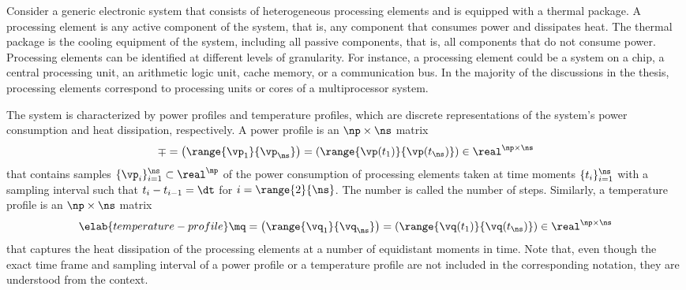 Consider a generic electronic system that consists of \np heterogeneous
processing elements and is equipped with a thermal package. A processing element
is any active component of the system, that is, any component that consumes
power and dissipates heat. The thermal package is the cooling equipment of the
system, including all passive components, that is, all components that do not
consume power. Processing elements can be identified at different levels of
granularity. For instance, a processing element could be a system on a chip,
a central processing unit, an arithmetic logic unit, cache memory, or a
communication bus. In the majority of the discussions in the thesis, processing
elements correspond to processing units or cores of a multiprocessor system.

The system is characterized by power profiles and temperature profiles, which
are discrete representations of the system's power consumption and heat
dissipation, respectively. A power profile is an $\np \times \ns$ matrix
\[
  \mp
  = \left(\range{\vp_1}{\vp_\ns}\right)
  = \left(\range{\vp(t_1)}{\vp(t_\ns)}\right) \in \real^{\np \times \ns}
\]
that contains \ns samples $\{ \vp_i \}_{i = 1}^\ns \subset \real^\np$ of the
power consumption of \np processing elements taken at \ns time moments $\{ t_i
\}_{i = 1}^\ns$ with a sampling interval \dt such that $t_i - t_{i - 1} = \dt$
for $i = \range{2}{\ns}$. The number \ns is called the number of steps.
Similarly, a temperature profile is an $\np \times \ns$ matrix
\begin{equation} \elab{temperature-profile}
  \mq
  = \left(\range{\vq_1}{\vq_\ns}\right)
  = \left(\range{\vq(t_1)}{\vq(t_\ns)}\right) \in \real^{\np \times \ns}
\end{equation}
that captures the heat dissipation of the processing elements at a number of
equidistant moments in time. Note that, even though the exact time frame and
sampling interval of a power profile or a temperature profile are not included
in the corresponding notation, they are understood from the context.
